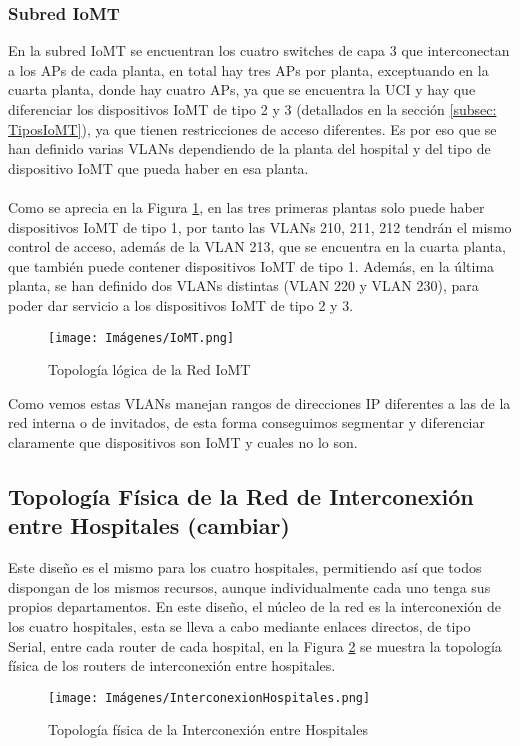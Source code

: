 \subsubsection{Subred IoMT}
En la subred IoMT se encuentran los cuatro switches de capa 3 que interconectan a los APs de cada planta, en total hay tres APs por planta, exceptuando en la cuarta planta, donde hay 
cuatro APs, ya que se encuentra la UCI y hay que diferenciar los dispositivos IoMT de tipo 2 y 3 (detallados en la sección \ref{subsec: TiposIoMT}), ya que tienen restricciones de acceso diferentes. Es por eso que se han definido varias VLANs dependiendo 
de la planta del hospital y del tipo de dispositivo IoMT que pueda haber en esa planta.
\\ \\
Como se aprecia en la Figura \ref{fig:Rediomt}, en las tres primeras plantas solo puede haber dispositivos IoMT de tipo 1, por tanto las VLANs 210, 211, 212 tendrán el mismo control de acceso, además de la VLAN 213, que se encuentra en la cuarta planta, que también puede contener dispositivos IoMT de tipo 1.
Además, en la última planta, se han definido dos VLANs distintas (VLAN 220 y VLAN 230), para poder dar servicio a los dispositivos IoMT de tipo 2 y 3.
\begin{figure}[H]
    \centering
    \texttt{[image: Imágenes/IoMT.png]}
    \caption{Topología lógica de la Red IoMT}
    \label{fig:Rediomt}
\end{figure}

Como vemos estas VLANs manejan rangos de direcciones IP diferentes a las de la red interna o de invitados, de esta forma conseguimos segmentar y diferenciar claramente que dispositivos son IoMT y cuales no lo son.

\subsection{Topología Física de la Red de Interconexión entre Hospitales (cambiar)}
Este diseño es el mismo para los cuatro hospitales, permitiendo así que todos dispongan de los mismos recursos, aunque individualmente cada uno tenga sus propios departamentos.
En este diseño, el núcleo de la red es la interconexión de los cuatro hospitales, esta se lleva a cabo mediante enlaces directos, de tipo Serial, entre cada router de cada hospital, en la Figura \ref{fig:InterconexionHospitales}
se muestra la topología física de los routers de interconexión entre hospitales.

\begin{figure}[H]
    \centering
    \texttt{[image: Imágenes/InterconexionHospitales.png]}
    \caption{Topología física de la Interconexión entre Hospitales}
    \label{fig:InterconexionHospitales}
\end{figure}

